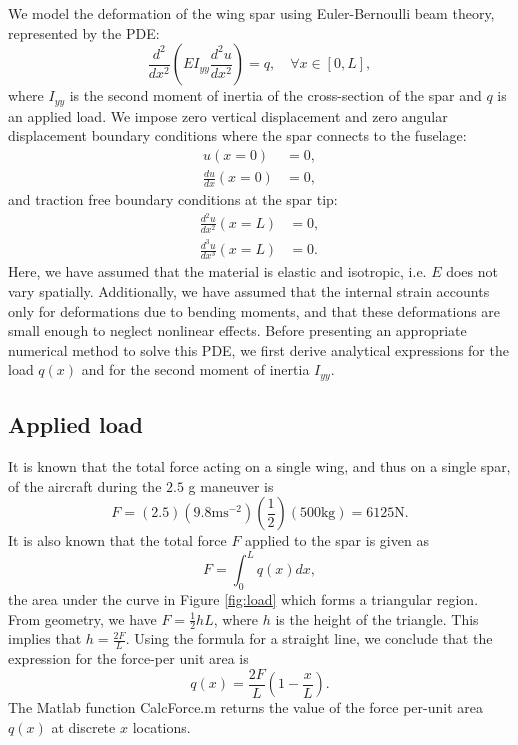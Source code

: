 \documentclass[11pt]{article}
\begin{document}
We model the deformation of the wing spar using Euler-Bernoulli
beam theory, represented by the PDE:
\begin{equation}
\frac{d^2}{d x^2}
\left( E I_{yy} \frac{d^2 u}{dx^2} \right) =
q, \quad \forall x \in [0,L],
\label{eq:pde}
\end{equation}
where $I_{yy}$ is the second moment of inertia of the
cross-section of the spar and $q$ is an applied load.
We impose zero vertical displacement and zero angular
displacement boundary conditions where the spar connects
to the fuselage:
\begin{equation}
\begin{aligned}
u(x=0) &= 0, \\
\frac{du}{dx} (x=0) &= 0,
\end{aligned}
\end{equation}
and traction free boundary conditions at the spar tip:
\begin{equation}
\begin{aligned}
\frac{d^2 u}{dx^2} (x=L) &= 0, \\
\frac{d^3 u}{dx^3} (x=L) &= 0.
\end{aligned}
\end{equation}
Here, we have assumed that the material is elastic
and isotropic, i.e. $E$ does not vary spatially.
Additionally, we have assumed that the internal
strain accounts only for deformations due to
bending moments, and that these deformations are
small enough to neglect nonlinear effects.
Before presenting an appropriate numerical method to
solve this PDE, we first derive analytical expressions
for the load $q(x)$ and for the second moment of inertia
$I_{yy}$.

\subsection{Applied load}

It is known that the total force acting on a single wing,
and thus on a single spar, of the aircraft during the $2.5$
g maneuver is
\begin{equation}
F = (2.5)(9.8 \text{m}\text{s}^{-2})(\frac12)(500 \text{kg}) = 6125 \text{N}.
\end{equation}
It is also known that the total force $F$ applied to the
spar is given as
\begin{equation}
F = \int_0 ^L q(x) dx,
\end{equation}
the area under the curve in Figure \ref{fig:load} which
forms a triangular region. From geometry, we have $F = \frac12 h L$,
where $h$ is the height of the triangle. This implies that
$h = \frac{2F}{L}$.
Using the formula for a straight line, we conclude that
the expression for the force-per unit area is
\begin{equation}
q(x) = \frac{2F}{L} \left( 1 - \frac{x}{L} \right).
\end{equation}
The Matlab function CalcForce.m returns the value
of the force per-unit area $q(x)$ at discrete $x$
locations.
\end{document}
